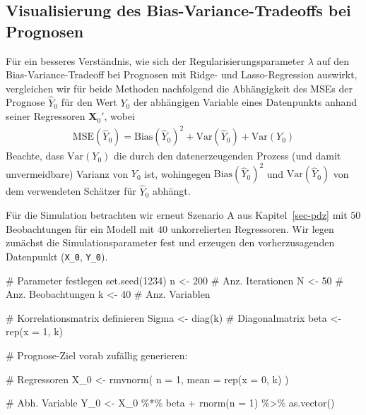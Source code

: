 \documentclass[
  a4paper,
  DIV=11,
  oneside]{scrreprt}
\newenvironment{Shaded}{\begin{snugshade}}{\end{snugshade}}
\newcommand{\AttributeTok}[1]{\textcolor[rgb]{0.40,0.45,0.13}{#1}}
\newcommand{\CommentTok}[1]{\textcolor[rgb]{0.37,0.37,0.37}{#1}}
\newcommand{\DecValTok}[1]{\textcolor[rgb]{0.68,0.00,0.00}{#1}}
\newcommand{\FunctionTok}[1]{\textcolor[rgb]{0.28,0.35,0.67}{#1}}
\newcommand{\NormalTok}[1]{\textcolor[rgb]{0.00,0.23,0.31}{#1}}
\newcommand{\OtherTok}[1]{\textcolor[rgb]{0.00,0.23,0.31}{#1}}
\newcommand{\SpecialCharTok}[1]{\textcolor[rgb]{0.37,0.37,0.37}{#1}}
\begin{document}
\subsection{Visualisierung des Bias-Variance-Tradeoffs bei
Prognosen}\label{visualisierung-des-bias-variance-tradeoffs-bei-prognosen}

Für ein besseres Verständnis, wie sich der Regularisierungsparameter
\(\lambda\) auf den Bias-Variance-Tradeoff bei Prognosen mit Ridge- und
Lasso-Regression auswirkt, vergleichen wir für beide Methoden
nachfolgend die Abhängigkeit des MSEs der Prognose \(\widehat{Y}_0\) für
den Wert \(Y_0\) der abhängigen Variable eines Datenpunkts anhand seiner
Regressoren \(\boldsymbol{X}_0'\), wobei \begin{align}
  \text{MSE}(\widehat{Y}_0) = \text{Bias}(\widehat{Y}_0)^2 + \text{Var}(\widehat{Y}_0) + \text{Var}(Y_0) \label{eq:pbvdecomp}
\end{align} Beachte, dass \(\text{Var}(Y_0)\) die durch den
datenerzeugenden Prozess (und damit unvermeidbare) Varianz von \(Y_0\)
ist, wohingegen \(\text{Bias}(\widehat{Y}_0)^2\) und
\(\text{Var}(\widehat{Y}_0)\) von dem verwendeten Schätzer für
\(\widehat{Y}_0\) abhängt.

Für die Simulation betrachten wir erneut Szenario A aus
Kapitel~\ref{sec-pdz} mit \(50\) Beobachtungen für ein Modell mit \(40\)
unkorrelierten Regressoren. Wir legen zunächst die Simulationsparameter
fest und erzeugen den vorherzusagenden Datenpunkt (\texttt{X\_0},
\texttt{Y\_0}).

\begin{Shaded}
\begin{Highlighting}[]
\CommentTok{\# Parameter festlegen}
\FunctionTok{set.seed}\NormalTok{(}\DecValTok{1234}\NormalTok{)}
\NormalTok{n }\OtherTok{\textless{}{-}} \DecValTok{200} \CommentTok{\# Anz. Iterationen}
\NormalTok{N }\OtherTok{\textless{}{-}} \DecValTok{50}  \CommentTok{\# Anz. Beobachtungen}
\NormalTok{k }\OtherTok{\textless{}{-}} \DecValTok{40}  \CommentTok{\# Anz. Variablen}

\CommentTok{\# Korrelationsmatrix definieren}
\NormalTok{Sigma }\OtherTok{\textless{}{-}} \FunctionTok{diag}\NormalTok{(k) }\CommentTok{\# Diagonalmatrix}
\NormalTok{beta }\OtherTok{\textless{}{-}} \FunctionTok{rep}\NormalTok{(}\AttributeTok{x =} \DecValTok{1}\NormalTok{, k)}

\CommentTok{\# Prognose{-}Ziel vorab zufällig generieren:}

\CommentTok{\# Regressoren}
\NormalTok{X\_0 }\OtherTok{\textless{}{-}} \FunctionTok{rmvnorm}\NormalTok{(}
  \AttributeTok{n =} \DecValTok{1}\NormalTok{, }
  \AttributeTok{mean =} \FunctionTok{rep}\NormalTok{(}\AttributeTok{x =} \DecValTok{0}\NormalTok{, k)}
\NormalTok{)}

\CommentTok{\# Abh. Variable}
\NormalTok{Y\_0 }\OtherTok{\textless{}{-}}\NormalTok{ X\_0 }\SpecialCharTok{\%*\%}\NormalTok{ beta }\SpecialCharTok{+} \FunctionTok{rnorm}\NormalTok{(}\AttributeTok{n =} \DecValTok{1}\NormalTok{) }\SpecialCharTok{\%\textgreater{}\%} 
  \FunctionTok{as.vector}\NormalTok{()}
\end{Highlighting}
\end{Shaded}
\end{document}
